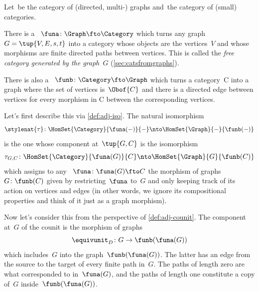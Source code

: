 \begin{example}
    Let~\Graph be the category of (directed, multi-) graphs and~\Category the category of (small) categories.

    There is a ~$\funa \colon \Graph \fto \Category$ which turns any graph~$G = \tup{V,E, s,t}$ into a category whose objects are the vertices~$V$ and whose morphisms are finite directed paths between vertices.
    This is called the \emph{free category generated by the graph~$G$} (\cref{sec:catsfromgraphs}).

    There is also a ~$\funb \colon \Category \fto \Graph$ which turns a category~C into a graph where the set of vertices is~$\Obof{C}$ and there is a directed edge between vertices for every morphism in C between the corresponding vertices.

    Let's first describe this  via \cref{def:adj-iso}.
    The natural isomorphism
    \begin{equation}\label{eq:cat-graph-adjunction-transpose-iso}
        \stylenat{\tau}\colon \HomSet{\Category}{\funa(-)}{-} \nto \HomSet{\Graph}{-}{\funb(-)}
    \end{equation}
    is the one whose component at~$\tup{G,C}$ is the isomorphism
    \begin{equation}\label{eq:cat-graph-adjunction-transpose-iso-components}
        \tau_{G,C} \colon \HomSet{\Category}{\funa(G)}{C} \nto \HomSet{\Graph}{G}{\funb(C)}
    \end{equation}
    which assigns to any ~$\funa\colon \funa(G) \fto C$ the morphism of graphs~$G \colon \funb(C)$ given by restricting~$\funa$ to~$G$ and only keeping track of its action on vertices and edges (in other words, we ignore its compositional properties and think of it just as a graph morphism).

    Now let's consider this  from the perspective of \cref{def:adj-counit}.
    The component at~$G$ of the counit is the morphism of graphs
    \begin{equation}\label{eq:cat-graph-adjunction-unit}
        \equivunit_D \colon G \to \funb(\funa(G))
    \end{equation}
    which includes~$G$ into the graph~$\funb(\funa(G))$.
    The latter has an edge from the source to the target of every finite path in~$G$.
    The paths of length zero are what corresponded to  in~$\funa(G)$, and the paths of length one constitute a copy of~$G$ inside~$\funb(\funa(G))$.


\end{example}
